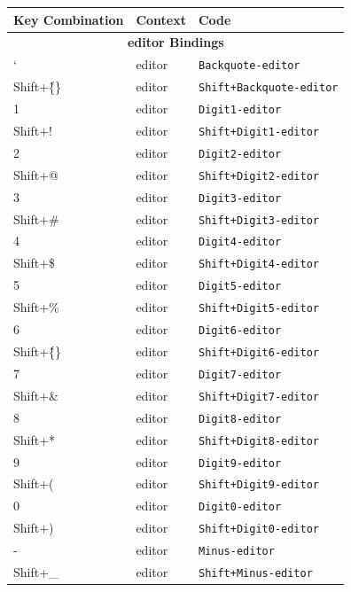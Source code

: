 \documentclass[11pt, a4paper]{article}
\begin{document}
\begin{appendices}
\begin{longtable}{|p{}|p{}|p{}|}
    \hline
    \textbf{Key Combination} & \textbf{Context} & \textbf{Code} \\ \hline
    \endhead
    \multicolumn{3}{|c|}{\textbf{editor Bindings}} \\ \hline
    ` & editor & \texttt{Backquote-editor} \\ \hline
    Shift+\~\{\} & editor & \texttt{Shift+Backquote-editor} \\ \hline
    1 & editor & \texttt{Digit1-editor} \\ \hline
    Shift+! & editor & \texttt{Shift+Digit1-editor} \\ \hline
    2 & editor & \texttt{Digit2-editor} \\ \hline
    Shift+@ & editor & \texttt{Shift+Digit2-editor} \\ \hline
    3 & editor & \texttt{Digit3-editor} \\ \hline
    Shift+\# & editor & \texttt{Shift+Digit3-editor} \\ \hline
    4 & editor & \texttt{Digit4-editor} \\ \hline
    Shift+\$ & editor & \texttt{Shift+Digit4-editor} \\ \hline
    5 & editor & \texttt{Digit5-editor} \\ \hline
    Shift+\% & editor & \texttt{Shift+Digit5-editor} \\ \hline
    6 & editor & \texttt{Digit6-editor} \\ \hline
    Shift+\^\{\} & editor & \texttt{Shift+Digit6-editor} \\ \hline
    7 & editor & \texttt{Digit7-editor} \\ \hline
    Shift+\& & editor & \texttt{Shift+Digit7-editor} \\ \hline
    8 & editor & \texttt{Digit8-editor} \\ \hline
    Shift+* & editor & \texttt{Shift+Digit8-editor} \\ \hline
    9 & editor & \texttt{Digit9-editor} \\ \hline
    Shift+( & editor & \texttt{Shift+Digit9-editor} \\ \hline
    0 & editor & \texttt{Digit0-editor} \\ \hline
    Shift+) & editor & \texttt{Shift+Digit0-editor} \\ \hline
    - & editor & \texttt{Minus-editor} \\ \hline
    Shift+\_ & editor & \texttt{Shift+Minus-editor} \\ \hline

\end{longtable}
\end{appendices}
\end{document}
